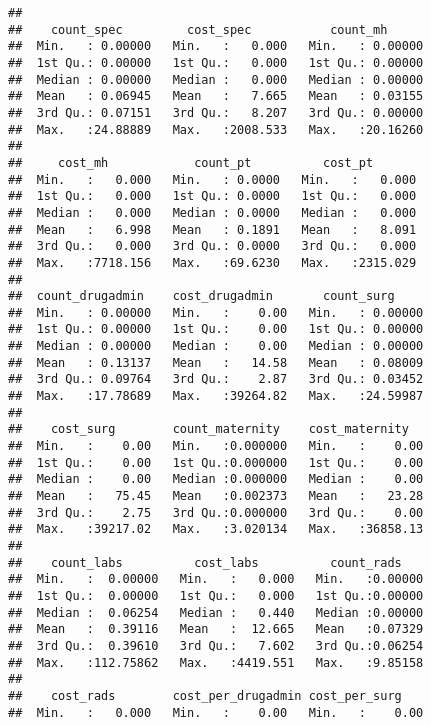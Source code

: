 \documentclass[]{article}
\begin{document}
\begin{verbatim}
##                                                          
##    count_spec         cost_spec           count_mh       
##  Min.   : 0.00000   Min.   :   0.000   Min.   : 0.00000  
##  1st Qu.: 0.00000   1st Qu.:   0.000   1st Qu.: 0.00000  
##  Median : 0.00000   Median :   0.000   Median : 0.00000  
##  Mean   : 0.06945   Mean   :   7.665   Mean   : 0.03155  
##  3rd Qu.: 0.07151   3rd Qu.:   8.207   3rd Qu.: 0.00000  
##  Max.   :24.88889   Max.   :2008.533   Max.   :20.16260  
##                                                          
##     cost_mh            count_pt          cost_pt        
##  Min.   :   0.000   Min.   : 0.0000   Min.   :   0.000  
##  1st Qu.:   0.000   1st Qu.: 0.0000   1st Qu.:   0.000  
##  Median :   0.000   Median : 0.0000   Median :   0.000  
##  Mean   :   6.998   Mean   : 0.1891   Mean   :   8.091  
##  3rd Qu.:   0.000   3rd Qu.: 0.0000   3rd Qu.:   0.000  
##  Max.   :7718.156   Max.   :69.6230   Max.   :2315.029  
##                                                         
##  count_drugadmin    cost_drugadmin       count_surg      
##  Min.   : 0.00000   Min.   :    0.00   Min.   : 0.00000  
##  1st Qu.: 0.00000   1st Qu.:    0.00   1st Qu.: 0.00000  
##  Median : 0.00000   Median :    0.00   Median : 0.00000  
##  Mean   : 0.13137   Mean   :   14.58   Mean   : 0.08009  
##  3rd Qu.: 0.09764   3rd Qu.:    2.87   3rd Qu.: 0.03452  
##  Max.   :17.78689   Max.   :39264.82   Max.   :24.59987  
##                                                          
##    cost_surg        count_maternity    cost_maternity    
##  Min.   :    0.00   Min.   :0.000000   Min.   :    0.00  
##  1st Qu.:    0.00   1st Qu.:0.000000   1st Qu.:    0.00  
##  Median :    0.00   Median :0.000000   Median :    0.00  
##  Mean   :   75.45   Mean   :0.002373   Mean   :   23.28  
##  3rd Qu.:    2.75   3rd Qu.:0.000000   3rd Qu.:    0.00  
##  Max.   :39217.02   Max.   :3.020134   Max.   :36858.13  
##                                                          
##    count_labs          cost_labs          count_rads     
##  Min.   :  0.00000   Min.   :   0.000   Min.   :0.00000  
##  1st Qu.:  0.00000   1st Qu.:   0.000   1st Qu.:0.00000  
##  Median :  0.06254   Median :   0.440   Median :0.00000  
##  Mean   :  0.39116   Mean   :  12.665   Mean   :0.07329  
##  3rd Qu.:  0.39610   3rd Qu.:   7.602   3rd Qu.:0.06254  
##  Max.   :112.75862   Max.   :4419.551   Max.   :9.85158  
##                                                          
##    cost_rads        cost_per_drugadmin cost_per_surg     
##  Min.   :   0.000   Min.   :    0.00   Min.   :    0.00  

\end{verbatim}
\end{document}

